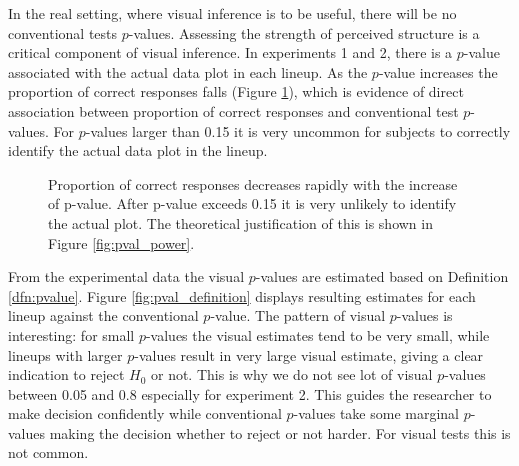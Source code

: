 \documentclass[12pt]{article}
\begin{document}
In the real setting, where visual inference is to be useful, there will be no conventional tests $p$-values. Assessing the strength of perceived structure is a critical component of visual inference. In experiments 1 and 2, there is a $p$-value associated with the actual data plot in each lineup. As the $p$-value increases the proportion of correct responses falls (Figure \ref{fig:pval_pcorrect}), which is evidence of direct association between proportion of correct responses and conventional test $p$-values. For  $p$-values  larger than 0.15 it is very uncommon for subjects to correctly identify the actual data plot in the lineup.

\begin{figure}[hbtp]
   \centering
       \caption{Proportion of correct responses decreases rapidly with the increase of p-value. After p-value exceeds 0.15 it is very unlikely to identify the actual plot. The theoretical justification of this is shown in Figure \ref{fig:pval_power}. }
       \label{fig:pval_pcorrect}
\end{figure}

From the experimental data the visual $p$-values are estimated based on Definition \ref{dfn:pvalue}. Figure \ref{fig:pval_definition} displays resulting estimates for each lineup against the conventional $p$-value.  The pattern of visual $p$-values is interesting: for small $p$-values the visual estimates tend to be very small, while lineups with larger $p$-values result in very large visual estimate, 
% 
 giving a clear indication to reject $H_0$ or not. This is why we do not see lot of visual $p$-values  between 0.05 and 0.8 especially for experiment 2. This guides the researcher to make decision confidently while conventional $p$-values take some marginal $p$-values making the decision whether to reject or not harder.
 For visual tests this is not common.  
\end{document}

